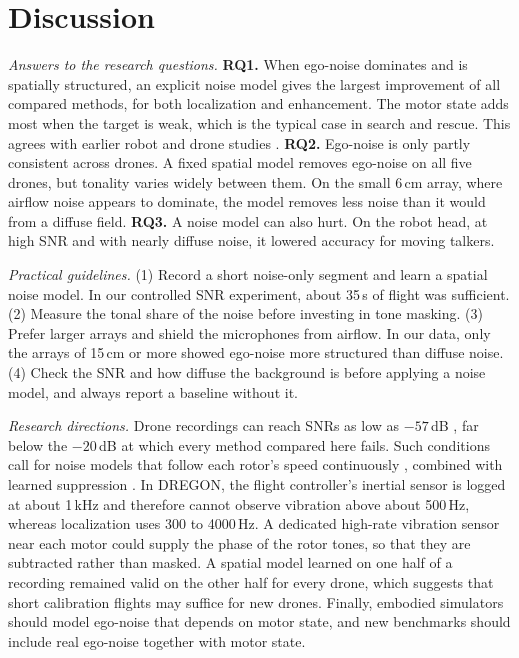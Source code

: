 \documentclass{svproc}
\begin{document}
\section{Discussion}\label{sec:discussion}
\emph{Answers to the research questions.}
\textbf{RQ1.} When ego-noise dominates and is spatially structured, an explicit noise model gives the largest improvement of all compared methods, for both localization and enhancement.
The motor state adds most when the target is weak, which is the typical case in search and rescue.
This agrees with earlier robot and drone studies \cite{nakamura2011gevd,furukawa2013ncm,yen2023ncm}.
\textbf{RQ2.} Ego-noise is only partly consistent across drones.
A fixed spatial model removes ego-noise on all five drones, but tonality varies widely between them.
On the small 6\,cm array, where airflow noise appears to dominate, the model removes less noise than it would from a diffuse field.
\textbf{RQ3.} A noise model can also hurt.
On the robot head, at high SNR and with nearly diffuse noise, it lowered accuracy for moving talkers.

\emph{Practical guidelines.}
(1) Record a short noise-only segment and learn a spatial noise model. In our controlled SNR experiment, about 35\,s of flight was sufficient.
(2) Measure the tonal share of the noise before investing in tone masking.
(3) Prefer larger arrays and shield the microphones from airflow. In our data, only the arrays of 15\,cm or more showed ego-noise more structured than diffuse noise.
(4) Check the SNR and how diffuse the background is before applying a noise model, and always report a baseline without it.

\emph{Research directions.}
Drone recordings can reach SNRs as low as $-57$\,dB \cite{gupta2025droneaudioset}, far below the $-20$\,dB at which every method compared here fails.
Such conditions call for noise models that follow each rotor's speed continuously \cite{yen2023ncm}, combined with learned suppression \cite{wang2022drone,gulli2025rotor}.
In DREGON, the flight controller's inertial sensor is logged at about 1\,kHz and therefore cannot observe vibration above about 500\,Hz, whereas localization uses 300 to 4000\,Hz.
A dedicated high-rate vibration sensor near each motor could supply the phase of the rotor tones, so that they are subtracted rather than masked.
A spatial model learned on one half of a recording remained valid on the other half for every drone, which suggests that short calibration flights may suffice for new drones.
Finally, embodied simulators \cite{chen2022soundspaces2} should model ego-noise that depends on motor state, and new benchmarks should include real ego-noise together with motor state.
\end{document}
